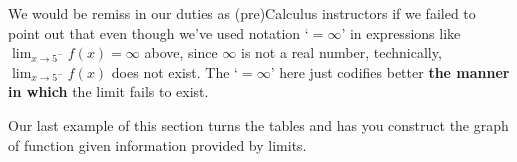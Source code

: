 \documentclass{ximera}
\begin{document}
\begin{image}
\end{image}
\begin{center}
\end{center}    
    


We would be remiss in our duties as (pre)Calculus instructors if we failed to point out that even though we've  used notation `$= \infty$'  in expressions like $\lim_{x \rightarrow 5^{-} }f(x) = \infty$ above, since $\infty$ is not a real number, technically, $\lim_{x \rightarrow 5^{-} }f(x)$ does not exist.  The  `$= \infty$' here just codifies better \textbf{the manner in which} the limit fails to exist.



Our last example of this section turns the tables and has you construct the graph of function given information provided by limits.
\end{document}
